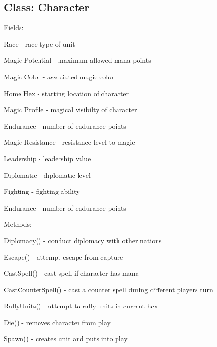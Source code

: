 \subsection*{Class:  Character}
\begin{al}
	\item[Fields:] \parbox{\textwidth}{Race - race type of unit}
    \item[] \parbox{\textwidth}{Magic Potential  -  maximum allowed mana points}
    \item[] \parbox{\textwidth}{Magic Color - associated magic color}
    \item[] \parbox{\textwidth}{Home Hex  -  starting location of character}
    \item[] \parbox{\textwidth}{Magic Profile - magical visibilty of character }
    \item[] \parbox{\textwidth}{Endurance - number of endurance points}
    \item[] \parbox{\textwidth}{Magic Resistance - resistance level to magic }
    \item[] \parbox{\textwidth}{Leadership  -  leadership value}
    \item[] \parbox{\textwidth}{Diplomatic - diplomatic level}
    \item[] \parbox{\textwidth}{Fighting - fighting ability}
    \item[] \parbox{\textwidth}{Endurance - number of endurance points}
	\item[Methods:] \parbox{\textwidth}{Diplomacy() - conduct diplomacy with other nations }
    \item[] \parbox{\textwidth}{Escape() - attempt escape from capture}
    \item[] \parbox{\textwidth}{CastSpell() - cast spell if character has mana}
    \item[] \parbox{\textwidth}{CastCounterSpell() - cast a counter spell during different players turn}
    \item[] \parbox{\textwidth}{RallyUnits() - attempt to rally units in current hex}
    \item[] \parbox{\textwidth}{Die()  -  removes character from play}
    \item[] \parbox{\textwidth}{Spawn() - creates unit and puts into play}
\end{al}


